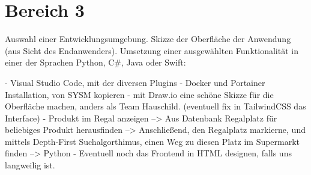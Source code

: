 \section{Bereich 3}
Auswahl einer Entwicklungsumgebung.
Skizze der Oberfläche der Anwendung (aus Sicht des Endanwenders).
Umsetzung einer ausgewählten Funktionalität in einer der Sprachen Python, C\#, Java oder Swift:

- Visual Studio Code, mit der diversen Plugins
- Docker und Portainer Installation, von SYSM kopieren
- mit Draw.io eine schöne Skizze für die Oberfläche machen, anders als Team Hauschild. (eventuell fix in TailwindCSS das Interface)
- Produkt im Regal anzeigen --> Aus Datenbank Regalplatz für beliebiges Produkt herausfinden --> Anschließend, den Regalplatz markierne, und mittels Depth-First Suchalgorthimus, einen Weg zu diesen Platz im Supermarkt finden --> Python
- Eventuell noch das Frontend in HTML designen, falls uns langweilig ist.